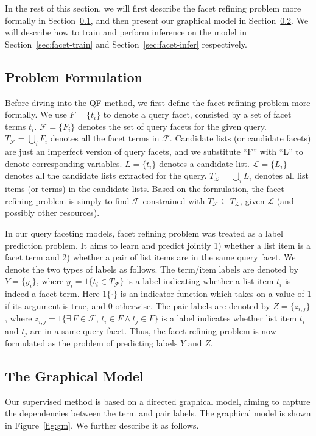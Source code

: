 In the rest of this section, we will first describe the facet refining problem more formally in Section~\ref{sec:facet-formulation}, and then present our graphical model in Section~\ref{sec:facet-model}. We will describe how to train and perform inference on the model in Section~\ref{sec:facet-train} and Section~\ref{sec:facet-infer} respectively.

\subsection{Problem Formulation}
\label{sec:facet-formulation}
Before diving into the QF method, we first define the facet refining problem more formally. We use $F=\{t_i\}$ to denote a query facet, consisted by a set of facet terms $t_i$. $\mathcal{F}=\{F_i\}$ denotes the set of query facets for the given query. $T_\mathcal{F}=\bigcup_i{F_i}$ denotes all the facet terms in $\mathcal{F}$. Candidate lists (or candidate facets) are just an imperfect version of query facets, and we substitute ``F'' with ``L'' to denote corresponding variables. $L=\{t_i\}$ denotes a candidate list. $\mathcal{L}=\{L_i\}$ denotes all the candidate lists extracted for the query. $T_\mathcal{L}=\bigcup_i{L_i}$ denotes all list items (or terms) in the candidate lists. Based on the formulation, the facet refining problem is simply to find $\mathcal{F}$ constrained with $T_\mathcal{F} \subseteq T_\mathcal{L}$, given $\mathcal{L}$ (and possibly other resources).

In our query faceting models, facet refining problem was treated as a label prediction problem. It aims to learn and predict jointly 1) whether a list item is a facet term and 2) whether a pair of list items are in the same query facet. We denote the two types of labels as follows. The term/item labels are denoted by $Y=\{y_i\}$, where $y_i = 1\{t_i\!\in\! T_{\mathcal{F}}\}$ is a label indicating whether a list item $t_i$ is indeed a facet term. Here $1\{\cdot\}$ is an indicator function which takes on a value of 1 if its argument is true, and 0 otherwise. The pair labels are denoted by $Z=\{z_{i,j}\}$, where $z_{i,j} = 1\{\exists\, F\!\in\!\mathcal{F}, \, t_{i}\!\in\!F  \wedge  t_{j}\!\in\!F \}$ is a label indicates whether list item $t_i$ and $t_j$ are in a same query facet. Thus, the facet refining problem is now formulated as the problem of predicting labels $Y$ and $Z$.

\subsection{The Graphical Model}
\label{sec:facet-model}
Our supervised method is based on a directed graphical model, aiming to capture the dependencies between the term and pair labels. The graphical model is shown in Figure~\ref{fig:gm}. We further describe it as follows.

